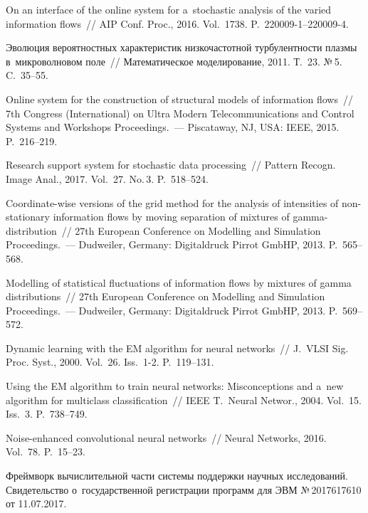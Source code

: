 \begin{multicols}{2}
{{\begin{thebibliography}{99}
 On an interface of the online
system for a~stochastic analysis of the varied information flows~// AIP Conf.
Proc., 2016. Vol.~1738. P.~220009-1--220009-4.

 Эволюция
вероятностных характеристик низкочастотной турбулентности плазмы 
в~микроволновом поле~// Математическое моделирование, 2011.
Т.~23. №\,5. C.~35--55.

 Online system for the
construction of structural models of information flows~// 7th
 Congress (International) on Ultra Modern Telecommunications and Control Systems and
Workshops Proceedings.~--- Piscataway, NJ, USA: IEEE, 2015. P.~216--219.

 Research support
system for stochastic data processing~// Pattern Recogn. Image Anal., 2017.
Vol.~27. No.\,3. P.~518--524.



Coordinate-wise versions of the grid method for the analysis of intensities of
non-stationary information flows by moving separation of mixtures of
gamma-distribution~// 27th European Conference on Modelling and
Simulation Proceedings.~--- Dudweiler, Germany: Digitaldruck Pirrot GmbHP, 2013. P.~565--568.

 Modelling of statistical
fluctuations of information flows by mixtures of gamma distributions~// 
27th European Conference on Modelling and Simulation Proceedings.~--- 
Dudweiler, Germany: Digitaldruck Pirrot GmbHP, 2013. P.~569--572.

 Dynamic learning with
the EM algorithm for neural networks~// J.~VLSI Sig. Proc. Syst., 
2000. Vol.~26. Iss.~1-2. P.~119--131.

 Using the EM algorithm to train
neural networks: Misconceptions and a~new algorithm for multiclass classification~// 
IEEE T.~Neural Networ., 2004. Vol.~15. Iss.~3. P.~738--749.

 Noise-enhanced
convolutional neural networks~// Neural Networks, 2016. Vol.~78. P.~15--23.

 Фреймворк
вычислительной части системы поддержки научных исследований. Свидетельство
о~государственной регистрации программ для ЭВМ №\,2017617610 от 11.07.2017.
 \end{thebibliography}

 }
 }

\end{multicols}

